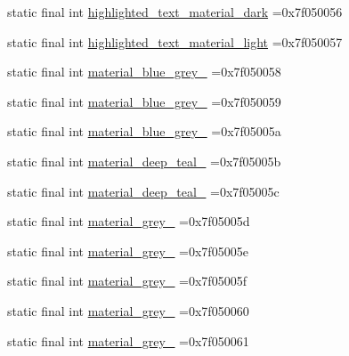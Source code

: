 \begin{DoxyCompactItemize}
static final int \mbox{\hyperlink{classbr_1_1unb_1_1cic_1_1mp_1_1marketmaster_1_1R_1_1color_a873d24fabe1f7918805ab1349e28e70f}{highlighted\+\_\+text\+\_\+material\+\_\+dark}} =0x7f050056
\item 
static final int \mbox{\hyperlink{classbr_1_1unb_1_1cic_1_1mp_1_1marketmaster_1_1R_1_1color_af122710cd2d6d9268741ad51fd8697c7}{highlighted\+\_\+text\+\_\+material\+\_\+light}} =0x7f050057
\item 
static final int \mbox{\hyperlink{classbr_1_1unb_1_1cic_1_1mp_1_1marketmaster_1_1R_1_1color_ab40354353ced5df2ab962edf539c870f}{material\+\_\+blue\+\_\+grey\+\_}} =0x7f050058
\item 
static final int \mbox{\hyperlink{classbr_1_1unb_1_1cic_1_1mp_1_1marketmaster_1_1R_1_1color_ad0edc125b95e29bb25aa3a453b6626b5}{material\+\_\+blue\+\_\+grey\+\_}} =0x7f050059
\item 
static final int \mbox{\hyperlink{classbr_1_1unb_1_1cic_1_1mp_1_1marketmaster_1_1R_1_1color_a4a91f4c8c886d0f5102e1e9bb9ed6c47}{material\+\_\+blue\+\_\+grey\+\_}} =0x7f05005a
\item 
static final int \mbox{\hyperlink{classbr_1_1unb_1_1cic_1_1mp_1_1marketmaster_1_1R_1_1color_a601cb74561b5795b07aeff29934f7940}{material\+\_\+deep\+\_\+teal\+\_}} =0x7f05005b
\item 
static final int \mbox{\hyperlink{classbr_1_1unb_1_1cic_1_1mp_1_1marketmaster_1_1R_1_1color_a0dbd8c39c121b0071f0dc96fa57836cf}{material\+\_\+deep\+\_\+teal\+\_}} =0x7f05005c
\item 
static final int \mbox{\hyperlink{classbr_1_1unb_1_1cic_1_1mp_1_1marketmaster_1_1R_1_1color_a131c86bb017ee71196c9d0a0628a2b30}{material\+\_\+grey\+\_}} =0x7f05005d
\item 
static final int \mbox{\hyperlink{classbr_1_1unb_1_1cic_1_1mp_1_1marketmaster_1_1R_1_1color_a3cf89078ad18fd84f69a6722c868f3ff}{material\+\_\+grey\+\_}} =0x7f05005e
\item 
static final int \mbox{\hyperlink{classbr_1_1unb_1_1cic_1_1mp_1_1marketmaster_1_1R_1_1color_a824c67756ee3ec77c3e9977ca36d2528}{material\+\_\+grey\+\_}} =0x7f05005f
\item 
static final int \mbox{\hyperlink{classbr_1_1unb_1_1cic_1_1mp_1_1marketmaster_1_1R_1_1color_a406f62bf75e00e34599d563d0ac0dc29}{material\+\_\+grey\+\_}} =0x7f050060
\item 
static final int \mbox{\hyperlink{classbr_1_1unb_1_1cic_1_1mp_1_1marketmaster_1_1R_1_1color_ad6fc5a3f316910295c9ea6c865060657}{material\+\_\+grey\+\_}} =0x7f050061

\end{DoxyCompactItemize}
